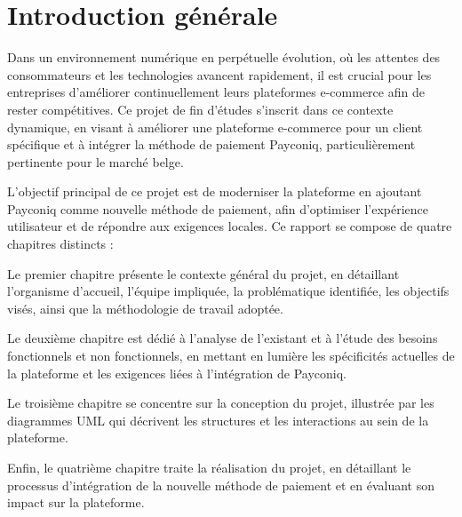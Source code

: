 \chapter*{Introduction générale}


Dans un environnement numérique en perpétuelle évolution, où les attentes des consommateurs et les technologies avancent rapidement, il est crucial pour les entreprises d'améliorer continuellement leurs plateformes e-commerce afin de rester compétitives. Ce projet de fin d'études s'inscrit dans ce contexte dynamique, en visant à améliorer une plateforme e-commerce pour un client spécifique et à intégrer la méthode de paiement Payconiq, particulièrement pertinente pour le marché belge.

\vspace{10pt}

L’objectif principal de ce projet est de moderniser la plateforme en ajoutant Payconiq comme nouvelle méthode de paiement, afin d'optimiser l'expérience utilisateur et de répondre aux exigences locales. Ce rapport se compose de quatre chapitres distincts : 

Le premier chapitre présente le contexte général du projet, en détaillant l'organisme d'accueil, l'équipe impliquée, la problématique identifiée, les objectifs visés, ainsi que la méthodologie de travail adoptée. 

Le deuxième chapitre est dédié à l'analyse de l'existant et à l'étude des besoins fonctionnels et non fonctionnels, en mettant en lumière les spécificités actuelles de la plateforme et les exigences liées à l'intégration de Payconiq.

Le troisième chapitre se concentre sur la conception du projet, illustrée par les diagrammes UML qui décrivent les structures et les interactions au sein de la plateforme.

Enfin, le quatrième chapitre traite la réalisation du projet, en détaillant le processus d'intégration de la nouvelle méthode de paiement et en évaluant son impact sur la plateforme.

\vspace{10pt}


